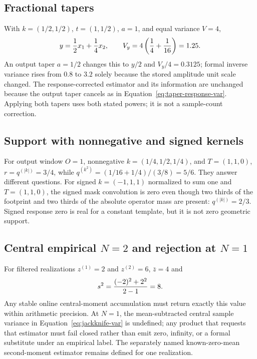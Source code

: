 \documentclass[11pt]{article}
\begin{document}
\subsection{Fractional tapers}

With $k=(1/2,1/2)$, $t=(1,1/2)$, $a=1$, and equal variance $V=4$,
\begin{equation}
 y={1\over2}x_1+{1\over4}x_2,\qquad
 V_y=4\left({1\over4}+{1\over16}\right)=1.25.
 \label{eq:case-input-taper}
\end{equation}
An output taper $a=1/2$ changes this to $y/2$ and $V_y/4=0.3125$; formal
inverse variance rises from $0.8$ to $3.2$ solely because the stored amplitude
unit scale changed.  The response-corrected estimator and its information are
unchanged because the output taper cancels as in
Equation~\eqref{eq:taper-response-var}.  Applying both tapers uses both stated
powers; it is not a sample-count correction.

\subsection{Support with nonnegative and signed kernels}

For output window $O=1$, nonnegative $k=(1/4,1/2,1/4)$, and $T=(1,1,0)$,
$r=q^{(|k|)}=3/4$, while $q^{(k^2)}=(1/16+1/4)/(3/8)=5/6$.
They answer different questions.  For signed $k=(-1,1,1)$ normalized to sum
one and $T=(1,1,0)$, the signed mask convolution is zero even though two thirds
of the footprint and two thirds of the absolute operator mass are present:
$q^{(|k|)}=2/3$.  Signed response zero is real for a constant template, but it
is not zero geometric support.

\subsection{Central empirical $N=2$ and rejection at $N=1$}

For filtered realizations $z^{(1)}=2$ and $z^{(2)}=6$, $\bar z=4$ and
\begin{equation}
 s^2={(-2)^2+2^2\over2-1}=8.
 \label{eq:case-N2}
\end{equation}
Any stable online central-moment accumulation must return exactly this value
within arithmetic precision.  At $N=1$, the mean-subtracted central sample
variance in Equation~\eqref{eq:jackknife-var} is undefined; any product that
requests that estimator must fail closed rather than emit zero, infinity, or
a formal substitute under an empirical label.  The separately named
known-zero-mean second-moment estimator remains defined for one realization.
\end{document}
